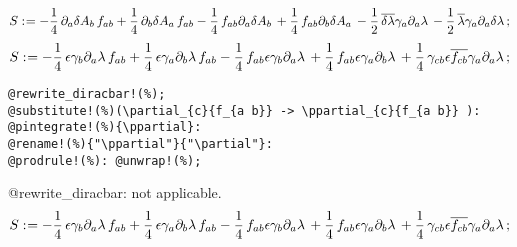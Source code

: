 \documentclass[11pt]{article}
\def\specialcolon{\mathrel{\mathop{:}}\hspace{-.5em}}
\renewcommand{\bar}[1]{\overline{#1}}
\begin{document}
\begin{dmath*}[compact, spread=2pt]
S\specialcolon{}=  - \frac{1}{4}\, {\partial}_{a}{\delta{{A}_{b}}}\,  {f}_{a b} + \frac{1}{4}\, {\partial}_{b}{\delta{{A}_{a}}}\,  {f}_{a b} - \frac{1}{4}\, {f}_{a b} {\partial}_{a}{\delta{{A}_{b}}}\,  + \frac{1}{4}\, {f}_{a b} {\partial}_{b}{\delta{{A}_{a}}}\,  - \frac{1}{2}\, \bar{\delta{\lambda}} {\gamma}_{a} {\partial}_{a}{\lambda}\,  - \frac{1}{2}\, \bar{\lambda} {\gamma}_{a} {\partial}_{a}{\delta{\lambda}}\, ;
\end{dmath*}
\begin{dmath*}[compact, spread=2pt]
S\specialcolon{}=  - \frac{1}{4}\, \epsilon {\gamma}_{b} {\partial}_{a}{\lambda}\,  {f}_{a b} + \frac{1}{4}\, \epsilon {\gamma}_{a} {\partial}_{b}{\lambda}\,  {f}_{a b} - \frac{1}{4}\, {f}_{a b} \epsilon {\gamma}_{b} {\partial}_{a}{\lambda}\,  + \frac{1}{4}\, {f}_{a b} \epsilon {\gamma}_{a} {\partial}_{b}{\lambda}\,  + \frac{1}{4}\, {\gamma}_{c b} \epsilon \bar{{f}_{c b}} {\gamma}_{a} {\partial}_{a}{\lambda}\, ;
\end{dmath*}
{\color[named]{Blue}\begin{verbatim}
@rewrite_diracbar!(%);
@substitute!(%)(\partial_{c}{f_{a b}} -> \ppartial_{c}{f_{a b}} ):
@pintegrate!(%){\ppartial}:
@rename!(%){"\ppartial"}{"\partial"}:
@prodrule!(%): @unwrap!(%);
\end{verbatim}}
@rewrite\_diracbar: not applicable.
\begin{dmath*}[compact, spread=2pt]
S\specialcolon{}=  - \frac{1}{4}\, \epsilon {\gamma}_{b} {\partial}_{a}{\lambda}\,  {f}_{a b} + \frac{1}{4}\, \epsilon {\gamma}_{a} {\partial}_{b}{\lambda}\,  {f}_{a b} - \frac{1}{4}\, {f}_{a b} \epsilon {\gamma}_{b} {\partial}_{a}{\lambda}\,  + \frac{1}{4}\, {f}_{a b} \epsilon {\gamma}_{a} {\partial}_{b}{\lambda}\,  + \frac{1}{4}\, {\gamma}_{c b} \epsilon \bar{{f}_{c b}} {\gamma}_{a} {\partial}_{a}{\lambda}\, ;
\end{dmath*}
\end{document}
